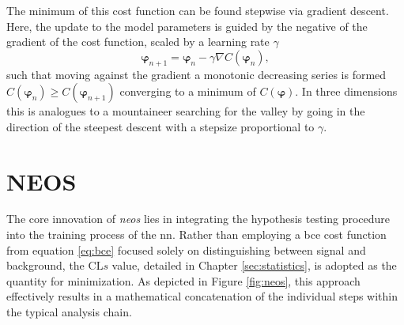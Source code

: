 The minimum of this cost function can be found stepwise via gradient descent. Here, the update to the model parameters is guided by the negative of the gradient of the cost function, scaled by a learning rate $\gamma$
\begin{equation}
    \bm{\varphi}_{n+1} = \bm{\varphi}_n-\gamma\nabla C(\bm{\varphi}_n),
    \label{eq:grad_descent}
\end{equation}
such that moving against the gradient a monotonic decreasing series is formed $C(\bm{\varphi}_n )\ge C(\bm{\varphi}_{n+1})$ converging to a minimum of $C(\bm{\varphi})$. In three dimensions this is analogues to a mountaineer searching for the valley by going in the direction of the steepest descent with a stepsize proportional to $\gamma$.




\section{NEOS}
The core innovation of \textit{\ac{neos}} lies in integrating the hypothesis testing procedure into the training process of the \ac{nn}. Rather than employing a \ac{bce} cost function from equation \ref{eq:bce} focused solely on distinguishing between signal and background, the $\mathrm{CL}s$ value, detailed in Chapter \ref{sec:statistics}, is adopted as the quantity for minimization. As depicted in Figure \ref{fig:neos}, this approach effectively results in a mathematical concatenation of the individual steps within the typical analysis chain.

